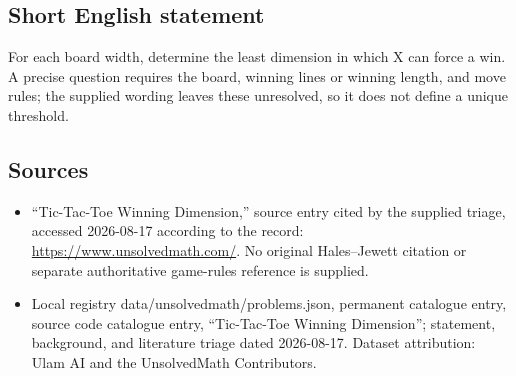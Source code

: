 \documentclass[11pt]{article}
\begin{document}
\subsection{Short English statement}
For each board width, determine the least dimension in which X can force a win. A precise question requires the board, winning lines or winning length, and move rules; the supplied wording leaves these unresolved, so it does not define a unique threshold.
\subsection{Sources}
\begin{itemize}
\item ``Tic-Tac-Toe Winning Dimension,'' source entry cited by the supplied triage, accessed 2026-08-17 according to the record: \url{https://www.unsolvedmath.com/}. No original Hales--Jewett citation or separate authoritative game-rules reference is supplied.
\item Local registry data/unsolvedmath/problems.json, permanent catalogue entry, source code catalogue entry, ``Tic-Tac-Toe Winning Dimension''; statement, background, and literature triage dated 2026-08-17. Dataset attribution: Ulam AI and the UnsolvedMath Contributors.
\end{itemize}
\end{document}
